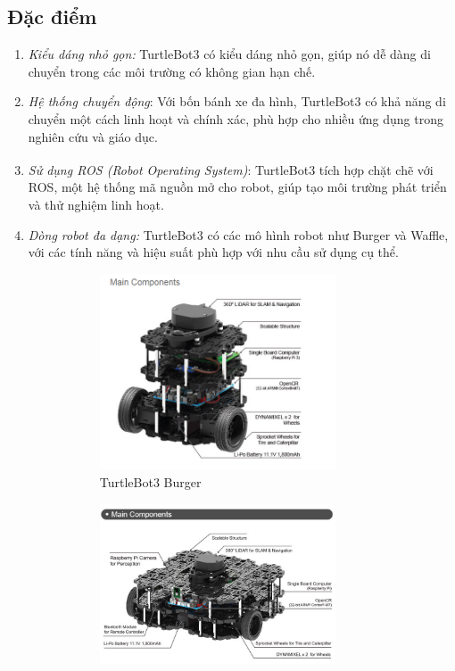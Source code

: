 \subsection{Đặc điểm}
\begin{enumerate}
    \item \textit{Kiểu dáng nhỏ gọn:} TurtleBot3 có kiểu dáng nhỏ gọn, giúp nó dễ dàng di chuyển trong các môi trường có không gian hạn chế.
    \item \textit{Hệ thống chuyển động}: Với bốn bánh xe đa hình, TurtleBot3 có khả năng di chuyển một cách linh hoạt và chính xác, phù hợp cho nhiều ứng dụng trong nghiên cứu và giáo dục.
    \item \textit{Sử dụng ROS\textsuperscript{\cite{ros}} (Robot Operating System)}: TurtleBot3 tích hợp chặt chẽ với ROS, một hệ thống mã nguồn mở cho robot, giúp tạo môi trường phát triển và thử nghiệm linh hoạt.
    \item \textit{Dòng robot đa dạng:} TurtleBot3 có các mô hình robot như Burger và Waffle, với các tính năng và hiệu suất phù hợp với nhu cầu sử dụng cụ thể.   
    \begin{figure}[htp]
        \begin{subfigure}{0.5\textwidth}
        \centering
        \includegraphics[width=7cm]{img/2_Theory/turtlebot3_burger.png}
        \caption{TurtleBot3 Burger}
        \end{subfigure}%
        \begin{subfigure}{0.5\textwidth}
        \centering
        \includegraphics[width=7cm]{img/2_Theory/turtlebot3_waffle_pi.jpg}

\end{subfigure}
\end{figure}
\end{enumerate}
